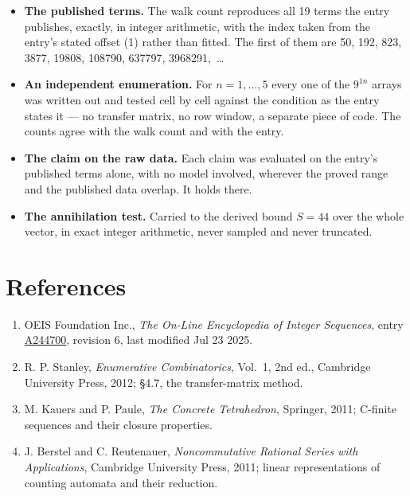 \documentclass[11pt]{article}
\theoremstyle{definition}
\begin{document}
\begin{itemize}

\item {\bfseries The published terms.} The walk count reproduces all 19 terms the entry publishes, exactly, in integer arithmetic, with the index taken from the entry's stated offset (1) rather than fitted. The first of them are 50, 192, 823, 3877, 19808, 108790, 637797, 3968291,~\dots

\item {\bfseries An independent enumeration.} For $n = 1,\dots,5$ every one of the $9^{1n}$ arrays was written out and tested cell by cell against the condition as the entry states it --- no transfer matrix, no row window, a separate piece of code. The counts agree with the walk count and with the entry.

\item {\bfseries The claim on the raw data.} Each claim was evaluated on the entry's published terms alone, with no model involved, wherever the proved range and the published data overlap. It holds there.

\item {\bfseries The annihilation test.} Carried to the derived bound $S = 44$ over the whole vector, in exact integer arithmetic, never sampled and never truncated.

\end{itemize}

\section{References}

\begin{enumerate}

\item OEIS Foundation Inc., \emph{The On-Line Encyclopedia of Integer Sequences}, entry \href{https://oeis.org/A244700}{A244700}, revision 6, last modified Jul 23 2025.

\item R. P. Stanley, \emph{Enumerative Combinatorics}, Vol.~1, 2nd ed., Cambridge University Press, 2012; \S4.7, the transfer-matrix method.

\item M. Kauers and P. Paule, \emph{The Concrete Tetrahedron}, Springer, 2011; C-finite sequences and their closure properties.

\item J. Berstel and C. Reutenauer, \emph{Noncommutative Rational Series with Applications}, Cambridge University Press, 2011; linear representations of counting automata and their reduction.

\end{enumerate}
\end{document}
